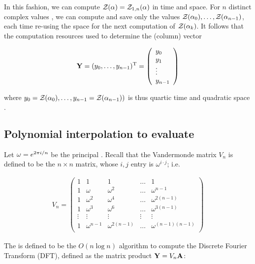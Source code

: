 In this fashion, we can compute ${\mathcal Z}_{}(\alpha)={\mathcal Z}_{1,n}(\alpha)$ in
 time and  space. For $n$ distinct complex values
\alphaN, we can compute and save only the
values ${\mathcal Z}_{}(\alpha_0),\dots,{\mathcal Z}_{}(\alpha_{n-1})$, each time re-using the
 space for the next computation of ${\mathcal Z}_{}(\alpha_k)$. It follows that
the computation resources used to determine the (column) vector

\begin{align}
\label{eq:fftbor:yColumn}
\bfY = (y_0,\dots,y_{n-1})^{\text T} =
\left(
\begin{array}{l}
y_0 \\
y_1 \\
\vdots \\
y_{n-1} \\
\end{array}
\right)
\end{align}

where
$y_0={\mathcal Z}_{}(\alpha_0),\dots,y_{n-1}={\mathcal Z}_{}(\alpha_{n-1}))$ is thus quartic time  and quadratic space .

\subsection{Polynomial interpolation to evaluate
\texorpdfstring{}{}}
\label{subsec:fftbor:fft}

Let $\omega = e^{2 \pi i/n}$ be the principal \nRoU.
Recall that the Vandermonde matrix $V_{n}$ is defined to be the
$n \times n$ matrix, whose $i,j$ entry is $\omega^{i \cdot j}$; i.e.

\begin{align}
\label{eq:fftbor:vandermonde}
V_{n} =
\left(
\begin{array}{rrrrr}
1 & 1 & 1 & \dots & 1 \\
1 & \omega & \omega^2 & \dots & \omega^{n-1} \\
1 & \omega^2 & \omega^4 & \dots & \omega^{2(n-1)} \\
1 & \omega^3 & \omega^6 & \dots & \omega^{3(n-1)} \\
\vdots & \vdots & \vdots & \vdots & \vdots \\
1 & \omega^{n-1} & \omega^{2(n-1)} & \dots & \omega^{(n-1)(n-1)} \\
\end{array}
\right)
\end{align}

The \fft is defined to be the $O(n \log n)$
algorithm to compute the Discrete Fourier Transform (DFT), defined
as the matrix product ${\bf Y} = V_{n} {\bf A}$:

